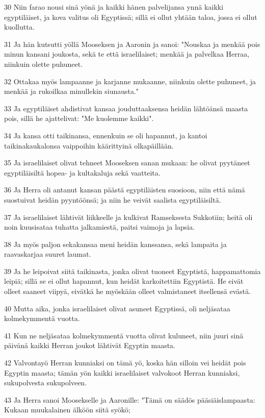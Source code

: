 \par 30 Niin farao nousi sinä yönä ja kaikki hänen palvelijansa ynnä kaikki egyptiläiset, ja kova valitus oli Egyptissä; sillä ei ollut yhtään taloa, jossa ei ollut kuollutta.
\par 31 Ja hän kutsutti yöllä Mooseksen ja Aaronin ja sanoi: "Nouskaa ja menkää pois minun kansani joukosta, sekä te että israelilaiset; menkää ja palvelkaa Herraa, niinkuin olette puhuneet.
\par 32 Ottakaa myös lampaanne ja karjanne mukaanne, niinkuin olette puhuneet, ja menkää ja rukoilkaa minullekin siunausta."
\par 33 Ja egyptiläiset ahdistivat kansaa jouduttaaksensa heidän lähtöänsä maasta pois, sillä he ajattelivat: "Me kuolemme kaikki".
\par 34 Ja kansa otti taikinansa, ennenkuin se oli hapannut, ja kantoi taikinakaukalonsa vaippoihin käärittyinä olkapäillään.
\par 35 Ja israelilaiset olivat tehneet Mooseksen sanan mukaan: he olivat pyytäneet egyptiläisiltä hopea- ja kultakaluja sekä vaatteita.
\par 36 Ja Herra oli antanut kansan päästä egyptiläisten suosioon, niin että nämä suostuivat heidän pyyntöönsä; ja niin he veivät saalista egyptiläisiltä.
\par 37 Ja israelilaiset lähtivät liikkeelle ja kulkivat Ramseksesta Sukkotiin; heitä oli noin kuusisataa tuhatta jalkamiestä, paitsi vaimoja ja lapsia.
\par 38 Ja myös paljon sekakansaa meni heidän kanssansa, sekä lampaita ja raavaskarjaa suuret laumat.
\par 39 Ja he leipoivat siitä taikinasta, jonka olivat tuoneet Egyptistä, happamattomia leipiä; sillä se ei ollut hapannut, kun heidät karkoitettiin Egyptistä. He eivät olleet saaneet viipyä, eivätkä he myöskään olleet valmistaneet itsellensä evästä.
\par 40 Mutta aika, jonka israelilaiset olivat asuneet Egyptissä, oli neljäsataa kolmekymmentä vuotta.
\par 41 Kun ne neljäsataa kolmekymmentä vuotta olivat kuluneet, niin juuri sinä päivänä kaikki Herran joukot lähtivät Egyptin maasta.
\par 42 Valvontayö Herran kunniaksi on tämä yö, koska hän silloin vei heidät pois Egyptin maasta; tämän yön kaikki israelilaiset valvokoot Herran kunniaksi, sukupolvesta sukupolveen.
\par 43 Ja Herra sanoi Moosekselle ja Aaronille: "Tämä on säädös pääsiäislampaasta: Kukaan muukalainen älköön siitä syökö;

